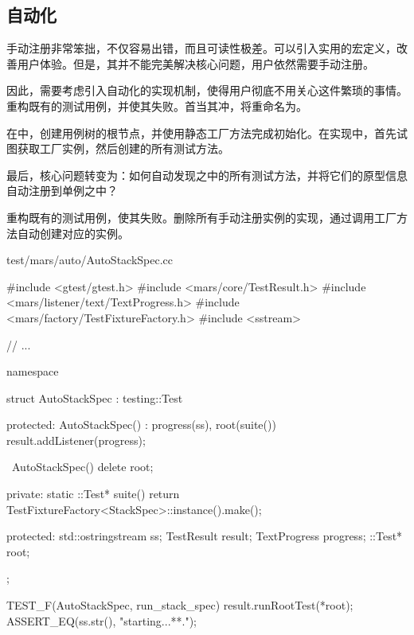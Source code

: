 \begin{content}

\subsection{自动化}

手动注册非常笨拙，不仅容易出错，而且可读性极差。可以引入实用的宏定义，改善用户体验。但是，其并不能完美解决核心问题，用户依然需要手动注册。

因此，需要考虑引入自动化的实现机制，使得用户彻底不用关心这件繁琐的事情。重构既有的测试用例，并使其失败。首当其冲，将重命名为。

在中，创建用例树的根节点，并使用静态工厂方法完成初始化。在实现中，首先试图获取工厂实例，然后创建的所有测试方法。

最后，核心问题转变为：如何自动发现之中的所有测试方法，并将它们的原型信息自动注册到单例之中？

重构既有的测试用例，使其失败。删除所有手动注册实例的实现，通过调用工厂方法自动创建对应的实例。

\begin{nodiff}{test/mars/auto/AutoStackSpec.cc}
 \begin{c++}
#include <gtest/gtest.h>
#include <mars/core/TestResult.h>
#include <mars/listener/text/TextProgress.h>
#include <mars/factory/TestFixtureFactory.h>
#include <sstream>

// ...

namespace {
  struct AutoStackSpec : testing::Test {
  protected:
    AutoStackSpec() : progress(ss), root(suite()) {
      result.addListener(progress);
    }

    ~AutoStackSpec() {
      delete root;
    }

  private:
    static ::Test* suite() {
      return TestFixtureFactory<StackSpec>::instance().make();
    }

  protected:
    std::ostringstream ss;
    TestResult result;
    TextProgress progress;
    ::Test* root;
  };
}

TEST_F(AutoStackSpec, run_stack_spec) {
  result.runRootTest(*root);
  ASSERT_EQ(ss.str(), "starting...\n***\nend.\n");
}
 \end{c++}
\end{nodiff}


\end{content}
